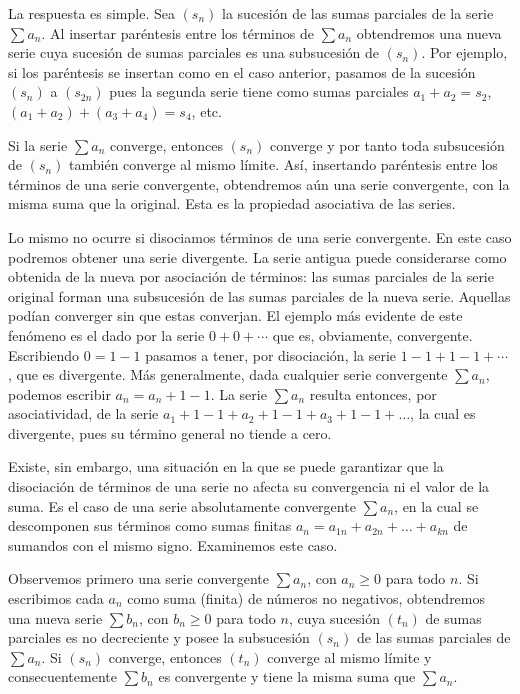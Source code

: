 \documentclass[12pt,oneside]{book}
\begin{document}
La respuesta es simple. Sea \((s_n)\) la sucesión de las sumas parciales de la serie \(\sum a_n\). Al insertar paréntesis entre los términos de \(\sum a_n\) obtendremos una nueva serie cuya sucesión de sumas parciales es una subsucesión de \((s_n)\). Por ejemplo, si los paréntesis se insertan como en el caso anterior, pasamos de la sucesión \((s_n)\) a \((s_{2n})\) pues la segunda serie tiene como sumas parciales \(a_1 + a_2 = s_2\), \((a_1 + a_2) + (a_3 + a_4) = s_4\), etc.

Si la serie \(\sum a_n\) converge, entonces \((s_n)\) converge y por tanto toda subsucesión de \((s_n)\) también converge al mismo límite. Así, insertando paréntesis entre los términos de una serie convergente, obtendremos aún una serie convergente, con la misma suma que la original. Esta es la propiedad asociativa de las series.

Lo mismo no ocurre si disociamos términos de una serie convergente. En este caso podremos obtener una serie divergente. La serie antigua puede considerarse como obtenida de la nueva por asociación de términos: las sumas parciales de la serie original forman una subsucesión de las sumas parciales de la nueva serie. Aquellas podían converger sin que estas converjan. El ejemplo más evidente de este fenómeno es el dado por la serie \(0 + 0 + \cdots\) que es, obviamente, convergente. Escribiendo \(0 = 1 - 1\) pasamos a tener, por disociación, la serie \(1 - 1 + 1 - 1 + \cdots\), que es divergente. Más generalmente, dada cualquier serie convergente \(\sum a_n\), podemos escribir \(a_n = a_n + 1 - 1\). La serie \(\sum a_n\) resulta entonces, por asociatividad, de la serie \(a_1 + 1 - 1 + a_2 + 1 - 1 + a_3 + 1 - 1 + \dots\), la cual es divergente, pues su término general no tiende a cero.

Existe, sin embargo, una situación en la que se puede garantizar que la disociación de términos de una serie no afecta su convergencia ni el valor de la suma. Es el caso de una serie absolutamente convergente \(\sum a_n\), en la cual se descomponen sus términos como sumas finitas \(a_n = a_{1n} + a_{2n} + \dots + a_{kn}\) de sumandos con el mismo signo. Examinemos este caso.

Observemos primero una serie convergente \(\sum a_n\), con \(a_n \ge 0\) para todo \(n\). Si escribimos cada \(a_n\) como suma (finita) de números no negativos, obtendremos una nueva serie \(\sum b_n\), con \(b_n \ge 0\) para todo \(n\), cuya sucesión \((t_n)\) de sumas parciales es no decreciente y posee la subsucesión \((s_n)\) de las sumas parciales de \(\sum a_n\). Si \((s_n)\) converge, entonces \((t_n)\) converge al mismo límite y consecuentemente \(\sum b_n\) es convergente y tiene la misma suma que \(\sum a_n\).
\end{document}
